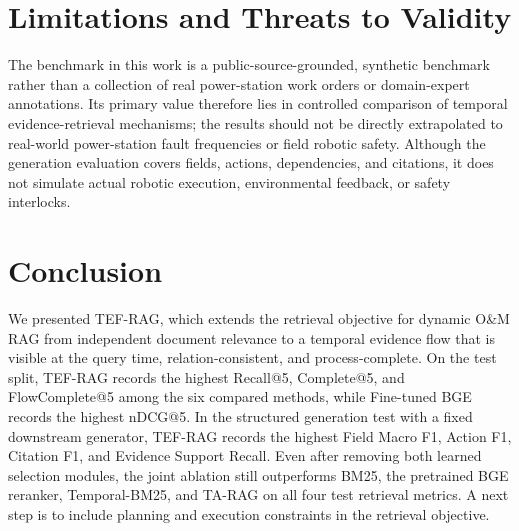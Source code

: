 \section{Limitations and Threats to Validity}
\label{sec:limitations}

The benchmark in this work is a public-source-grounded, 
synthetic benchmark rather than a collection of real 
power-station work orders or domain-expert annotations.
Its primary value therefore lies in controlled comparison of temporal evidence-retrieval mechanisms; the results should not be directly extrapolated to real-world power-station fault frequencies or field robotic safety.
Although the generation evaluation covers fields, actions, dependencies, and citations, it does not simulate actual robotic execution, environmental feedback, or safety interlocks.

\section{Conclusion}
\label{sec:conclusion}

We presented TEF-RAG, which extends the retrieval objective for dynamic O\&M RAG from independent document relevance to a temporal evidence flow that is visible at the query time, relation-consistent, and process-complete.
On the test split, TEF-RAG records the highest Recall@5, Complete@5, and FlowComplete@5 among the six compared methods, while Fine-tuned BGE records the highest nDCG@5. In the structured generation test with a fixed downstream generator, TEF-RAG records the highest Field Macro F1, Action F1, Citation F1, and Evidence Support Recall. Even after removing both learned selection modules, the joint ablation still outperforms BM25, the pretrained BGE reranker, Temporal-BM25, and TA-RAG on all four test retrieval metrics.
A next step is to include planning and execution constraints in the retrieval objective.
